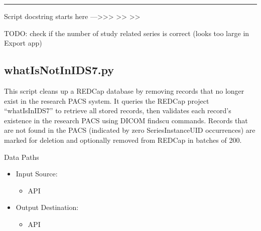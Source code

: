 \documentclass[letterpaper,10pt,english]{sphinxmanual}
\begin{document}
\bigskip\hrule\bigskip


\sphinxAtStartPar
Script docstring starts here —\textgreater{}\textgreater{}\textgreater{}
\textendash{}\textgreater{}\textgreater{}
\textendash{}\textgreater{}\textgreater{}

\sphinxAtStartPar
TODO: check if the number of study related series is correct (looks too large in Export app)

\sphinxstepscope


\subsection{whatIsNotInIDS7.py}
\label{\detokenize{Architecture/scripts/whatIsNotInIDS7:whatisnotinids7-py}}\label{\detokenize{Architecture/scripts/whatIsNotInIDS7::doc}}
\sphinxAtStartPar
This script cleans up a REDCap database by removing records that no longer exist in the research PACS system. It queries the REDCap project “whatIsInIDS7” to retrieve all stored records, then validates each record’s existence in the research PACS using DICOM findscu commands. Records that are not found in the PACS (indicated by zero SeriesInstanceUID occurrences) are marked for deletion and optionally removed from REDCap in batches of 200.

\sphinxAtStartPar
{}


\sphinxAtStartPar
{}


\sphinxAtStartPar
Data Paths
\begin{itemize}
\item {} 
\sphinxAtStartPar
Input Source:
\begin{itemize}
\item {} 
\sphinxAtStartPar
{} API

\end{itemize}

\item {} 
\sphinxAtStartPar
Output Destination:
\begin{itemize}
\item {} 
\sphinxAtStartPar
{} API

\end{itemize}

\end{itemize}
\end{document}
